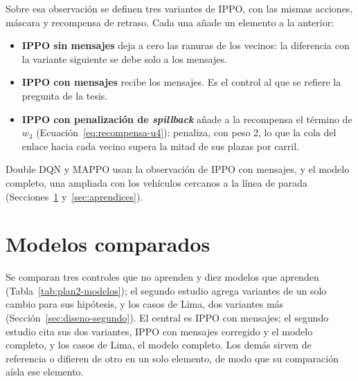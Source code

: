 Sobre esa observación se definen tres variantes de IPPO, con las mismas
acciones, máscara y recompensa de retraso. Cada una añade un elemento a
la anterior:
\begin{itemize}
  \item \textbf{IPPO sin mensajes} deja a cero las ranuras de los
    vecinos: la diferencia con la variante siguiente se debe solo a los
    mensajes.
  \item \textbf{IPPO con mensajes} recibe los mensajes. Es el control
    al que se refiere la pregunta de la tesis.
  \item \textbf{IPPO con penalización de \textit{spillback}} añade a la
    recompensa el término de $w_3$
    (Ecuación~\ref{eq:recompensa-u4}): penaliza, con peso 2, lo que la
    cola del enlace hacia cada vecino supera la mitad de sus plazas por
    carril.
\end{itemize}
Double DQN y MAPPO usan la observación de IPPO con mensajes, y el modelo
completo, una ampliada con los vehículos cercanos a la línea de parada
(Secciones~\ref{sec:modelos} y~\ref{sec:aprendices}).


\section{Modelos comparados}
\label{sec:modelos}

Se comparan tres controles que no aprenden y diez modelos que aprenden
(Tabla~\ref{tab:plan2-modelos}); el segundo estudio agrega variantes de
un solo cambio para sus hipótesis, y los casos de Lima, dos variantes
más (Sección~\ref{sec:diseno-segundo}). El central es IPPO con mensajes; el
segundo estudio cita sus dos variantes, IPPO con mensajes corregido y
el modelo completo, y los casos de Lima, el modelo completo. Los
demás sirven de referencia o difieren de otro en un solo elemento, de
modo que su comparación aísla ese elemento.


